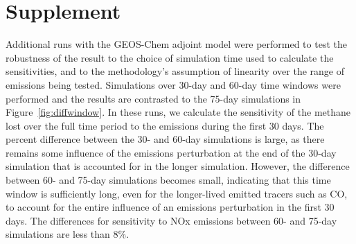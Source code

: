 \section{Supplement}

Additional runs with the GEOS-Chem adjoint model were performed to test the robustness of the result to the choice of simulation time used to calculate the sensitivities, and to the methodology's assumption of linearity over the range of emissions being tested. Simulations over 30-day and 60-day time windows were performed and the results are contrasted to the 75-day simulations in Figure~\ref{fig:diffwindow}. In these runs, we calculate the sensitivity of the methane lost over the full time period to the emissions during the first 30 days. The percent difference between the 30- and 60-day simulations is large, as there remains some influence of the emissions perturbation at the end of the 30-day simulation that is accounted for in the longer simulation. However, the difference between 60- and 75-day simulations becomes small, indicating that this time window is sufficiently long, even for the longer-lived emitted tracers such as CO, to account for the entire influence of an emissions perturbation in the first 30 days. The differences for sensitivity to NOx emissions between 60- and 75-day simulations are less than 8\%.
